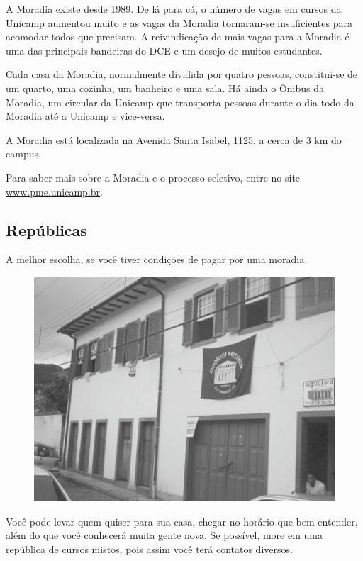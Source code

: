 A Moradia existe desde 1989. De lá para cá, o número de vagas em cursos da
Unicamp aumentou muito e as vagas da Moradia tornaram-se insuficientes para
acomodar todos que precisam. A reivindicação de mais vagas para a Moradia é uma
das principais bandeiras do DCE e um desejo de muitos estudantes.

Cada casa da Moradia, normalmente dividida por quatro pessoas, constitui-se de
um quarto, uma cozinha, um banheiro e uma sala. Há ainda o Ônibus da Moradia, um
circular da Unicamp que transporta pessoas durante o dia todo da Moradia até a
Unicamp e vice-versa.

A Moradia está localizada na Avenida Santa Isabel, 1125, a cerca de 3 km do
campus.

Para saber mais sobre a Moradia e o processo seletivo, entre no site
\url{www.pme.unicamp.br}.

\subsection{Repúblicas}

A melhor escolha, se você tiver condições de pagar por uma moradia.

\begin{figure}[h!]
    \vspace{-10pt}
    \centering
    \includegraphics[scale=0.58,keepaspectratio=true]{img/imgs/5-moradia/-034.jpg}
    \vspace{-10pt}
\end{figure}

Você pode levar quem quiser para sua casa, chegar no horário que bem entender,
além do que você conhecerá muita gente nova. Se possível, more em uma república
de cursos mistos, pois assim você terá contatos diversos.

